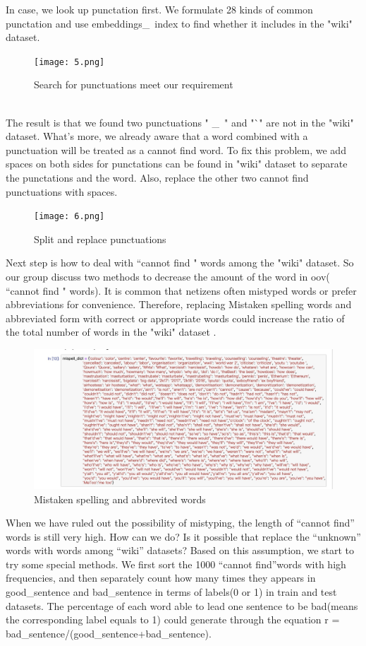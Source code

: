 \documentclass{article}
\begin{document}
\noindent In case, we look up punctation first. We formulate 28 kinds of common punctation and use embeddings\_\ index to find whether it includes in the "wiki" dataset.\\
\begin{figure}[h]
	\centering
	\texttt{[image: 5.png]}
	\caption{Search for punctuations meet our requirement}
\end{figure}\\
\noindent The result is that we found two punctuations " \_\ " and "`" are not in the "wiki" dataset. What's more, we already aware that a word combined with a punctuation will be treated as a cannot find word. To fix this problem, we add spaces on both sides for punctations can be found in "wiki" dataset to separate the punctations and the word. Also, replace the other two cannot find punctuations with spaces.\\
\begin{figure}[H]
	\centering
	\texttt{[image: 6.png]}
	\caption{Split and replace punctuations}
\end{figure}
\noindent Next step is how to deal with  “cannot find " words among the "wiki" dataset. So our group discuss two  methods to decrease the amount of the word in oov( “cannot find " words).  It is common that netizens often mistyped words or prefer abbreviations for convenience. Therefore, replacing Mistaken spelling words and abbreviated form with correct or appropriate words could increase the ratio of the total number of words in the "wiki" dataset . 
\begin{figure}[H]
	\centering
	\includegraphics[scale = 0.15]{mis.jpeg}
	\caption{Mistaken spelling and abbrevited words}
\end{figure}
\noindent When we have ruled out the  possibility of mistyping, the length of “cannot find” words is still very high. How can we do?  Is it possible that replace the “unknown” words with words among “wiki” datasets? Based on this assumption, we start to try some special methods. We first sort the 1000 “cannot find”words with high frequencies, and then separately count how many times they appears in good\_sentence and bad\_sentence in terms of labels(0 or 1) in train and test datasets. The percentage of each word able to lead one sentence to be bad(means the corresponding label equals to 1) could generate through the equation r = bad\_sentence/(good\_sentence+bad\_sentence).\\
\end{document}
